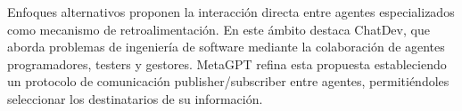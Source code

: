 \begin{itemize}
Enfoques alternativos proponen la interacción directa entre agentes especializados como mecanismo de retroalimentación\cite{zhuge_mindstorms_2023}\cite{du_improving_nodate}. En este ámbito destaca ChatDev\cite{qian_chatdev_2024}, que aborda problemas de ingeniería de software mediante la colaboración de agentes programadores, testers y gestores. MetaGPT\cite{hong_metagpt_2024} refina esta propuesta estableciendo un protocolo de comunicación publisher/subscriber entre agentes, permitiéndoles seleccionar los destinatarios de su información.
\end{itemize}





















